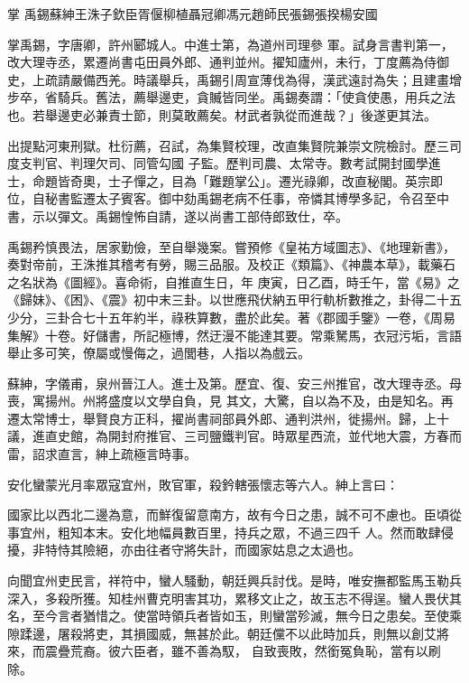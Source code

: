 
\begin{pinyinscope}

 掌
 禹錫蘇紳王洙子欽臣胥偃柳植聶冠卿馮元趙師民張錫張揆楊安國



 掌禹錫，字唐卿，許州郾城人。中進士第，為道州司理參
 軍。試身言書判第一，改大理寺丞，累遷尚書屯田員外郎、通判並州。擢知廬州，未行，丁度薦為侍御史，上疏請嚴備西羌。時議舉兵，禹錫引周宣薄伐為得，漢武遠討為失；且建畫增步卒，省騎兵。舊法，薦舉邊吏，貪贓皆同坐。禹錫奏謂：「使貪使愚，用兵之法也。若舉邊吏必兼責士節，則莫敢薦矣。材武者孰從而進哉？」後遂更其法。



 出提點河東刑獄。杜衍薦，召試，為集賢校理，改直集賢院兼崇文院檢討。歷三司度支判官、判理欠司、同管勾國
 子監。歷判司農、太常寺。數考試開封國學進士，命題皆奇奧，士子憚之，目為「難題掌公」。遷光祿卿，改直秘閣。英宗即位，自秘書監遷太子賓客。御中劾禹錫老病不任事，帝憐其博學多記，令召至中書，示以彈文。禹錫惶怖自請，遂以尚書工部侍郎致仕，卒。



 禹錫矜慎畏法，居家勤儉，至自舉幾案。嘗預修《皇祐方域圖志》、《地理新書》，奏對帝前，王洙推其稽考有勞，賜三品服。及校正《類篇》、《神農本草》，載藥石之名狀為《圖經》。喜命術，自推直生日，年
 庚寅，日乙酉，時壬午，當《易》之《歸妹》、《困》、《震》初中末三卦。以世應飛伏納五甲行軌析數推之，卦得二十五少分，三卦合七十五年約半，祿秩算數，盡於此矣。著《郡國手鑒》一卷，《周易集解》十卷。好儲書，所記極博，然迂漫不能達其要。常乘駑馬，衣冠污垢，言語舉止多可笑，僚屬或慢侮之，過閭巷，人指以為戲云。



 蘇紳，字儀甫，泉州晉江人。進士及第。歷宜、復、安三州推官，改大理寺丞。母喪，寓揚州。州將盛度以文學自負，見
 其文，大驚，自以為不及，由是知名。再遷太常博士，舉賢良方正科，擢尚書祠部員外郎、通判洪州，徙揚州。歸，上十議，進直史館，為開封府推官、三司鹽鐵判官。時眾星西流，並代地大震，方春而雷，詔求直言，紳上疏極言時事。



 安化蠻蒙光月率眾寇宜州，敗官軍，殺鈐轄張懷志等六人。紳上言曰：



 國家比以西北二邊為意，而鮮復留意南方，故有今日之患，誠不可不慮也。臣頃從事宜州，粗知本末。安化地幅員數百里，持兵之眾，不過三四千
 人。然而敢肆侵擾，非特恃其險絕，亦由往者守將失計，而國家姑息之太過也。



 向聞宜州吏民言，祥符中，蠻人騷動，朝廷興兵討伐。是時，唯安撫都監馬玉勒兵深入，多殺所獲。知桂州曹克明害其功，累移文止之，故玉志不得逞。蠻人畏伏其名，至今言者猶惜之。使當時領兵者皆如玉，則蠻當殄滅，無今日之患矣。至使乘隙蹂邊，屠殺將吏，其損國威，無甚於此。朝廷儻不以此時加兵，則無以創艾將來，而震疊荒裔。彼六臣者，雖不善為馭，
 自致喪敗，然銜冤負恥，當有以刷除。




\end{pinyinscope}
